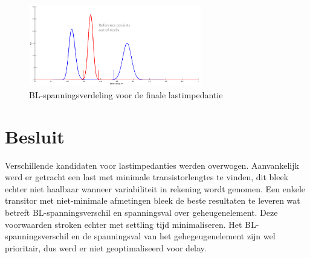 \begin{figure}[!ht]
  \centering
  \includegraphics[width=0.67\textwidth]{../fig/hfdst-last-var2.png}
  \caption[BL-spanningsverdeling voor de finale lastimpedantie]{BL-spanningsverdeling voor de finale lastimpedantie}
  \label{fig:distswitch}
\end{figure}

\section{Besluit}
Verschillende kandidaten voor lastimpedanties werden overwogen. Aanvankelijk werd er getracht een last met minimale transistorlengtes te vinden, dit bleek echter niet haalbaar wanneer variabiliteit in rekening wordt genomen. Een enkele transitor met niet-minimale afmetingen bleek de beste resultaten te leveren wat betreft BL-spanningsverschil en spanningsval over geheugenelement. Deze voorwaarden stroken echter met settling tijd minimaliseren. Het BL-spanningsverschil en de spanningsval van het gehegeugenelement zijn wel prioritair, dus werd er niet geoptimaliseerd voor delay.
